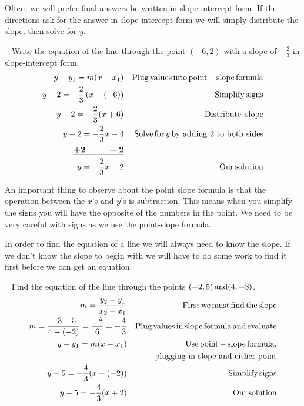  Often, we will prefer final answers be written in slope-intercept form. If the
directions ask for the answer in slope-intercept form we will simply
distribute the slope, then solve for $y$.

\begin{example}\label{Lin64}
~\pp
   Write the equation of the line through the point $(- 6, 2)$ with a slope of
  $- \displaystyle\frac{2}{3}$ in slope-intercept form.
  \begin{eqnarray*}
    y - y_1 = m (x - x_1) &  & \operatorname{Plug} \operatorname{values} \operatorname{into}
    \operatorname{point} - \operatorname{slope} \operatorname{formula}\\
    y - 2 = - \frac{2}{3} \left(x - (- 6)\right) &  & \operatorname{Simplify} \operatorname{signs}\\
    y - 2 = - \frac{2}{3} (x + 6) &  & \operatorname{Distribute~} \operatorname{slope}\\
    y - 2 = - \frac{2}{3} x - 4 &  & \operatorname{Solve} \operatorname{for} y \operatorname{by~adding~2~to~both~sides}\\
    \boldsymbol{\underline{+ 2 ~~~~~~~~ + 2}} &  & \\
    y = - \frac{2}{3} x - 2 &  & \operatorname{Our} \operatorname{solution}
  \end{eqnarray*}
\end{example}

 An important thing to observe about the point slope formula is that the
operation between the $x$'s and $y$'s is subtraction. This means when you
simplify the signs you will have the opposite of the numbers in the point. We
need to be very careful with signs as we use the point-slope formula.\pp

 In order to find the equation of a line we will always need to know the slope.
If we don't know the slope to begin with we will have to do some work to find
it first before we can get an equation.

\begin{example}\label{Lin65}
~\pp
   Find the equation of the line through the points $(- 2, 5) \operatorname{and} (4, -
  3)$.
  \begin{eqnarray*}
    m = \frac{y_2 - y_1}{x_2 - x_1} &  & \operatorname{First} \operatorname{we} \operatorname{must}
    \operatorname{find} \operatorname{the} \operatorname{slope}\\
    m = \frac{- 3 - 5}{4 - (- 2)} = \frac{- 8}{6} = - \frac{4}{3} &  &
    \operatorname{Plug} \operatorname{values} \operatorname{in} \operatorname{slope} \operatorname{formula} \operatorname{and}
    \operatorname{evaluate}\\
    y - y_1 = m (x - x_1) &  & \operatorname{Use} \operatorname{point} - \operatorname{slope}
    \operatorname{formula},\\
		& & \operatorname{~~~plugging~in~slope~and~either~point}\\
    y - 5 = - \frac{4}{3} (x - (- 2)) &  & \operatorname{Simplify} \operatorname{signs}\\
    y - 5 = - \frac{4}{3} (x + 2) &  & \operatorname{Our} \operatorname{solution}
  \end{eqnarray*}
\end{example}


